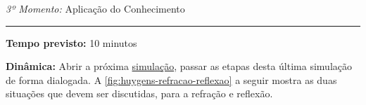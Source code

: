 
    \newpage
    \bigskip
    \noindent\emph{3º Momento:} Aplicação do Conhecimento
    \par\noindent\rule{.3\textwidth}{.5pt}  
    \par\noindent\textbf{Tempo previsto:} 10 minutos
    \smallskip
    \par\noindent\textbf{Dinâmica:} Abrir a próxima \href{https://www.walter-fendt.de/html5/phen/refractionhuygens_en.htm}{simulação}, passar as etapas desta última simulação de forma dialogada. A \autoref{fig:huygens-refracao-reflexao} a seguir mostra as duas situações que devem ser discutidas, para a refração e reflexão.

